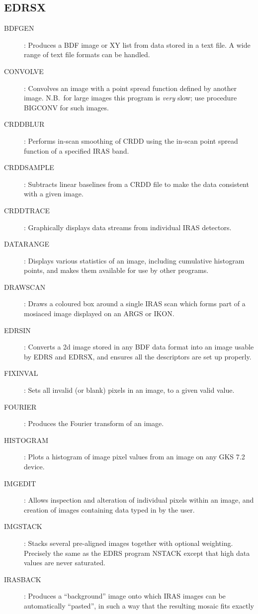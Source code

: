 \subsection {EDRSX}
\begin{description}
\begin{description}
\item[BDFGEN]: Produces a BDF image or XY list from data stored in a text file.
A wide range of text file formats can be handled.
\item[CONVOLVE]: Convolves an image with a point spread function defined by
another image.
N.B.\ for large images this program is {\em very} slow; use procedure BIGCONV
for such images.
\item[CRDDBLUR]: Performs in-scan smoothing of CRDD using the in-scan
point spread function of a specified IRAS band.
\item[CRDDSAMPLE]: Subtracts linear baselines from a CRDD file to make the 
data consistent with a given image.
\item[CRDDTRACE]: Graphically displays data streams from individual IRAS
detectors.
\item[DATARANGE]: Displays various statistics of an image, including cumulative
histogram points, and makes them available for use by other programs.
\item[DRAWSCAN]: Draws a coloured box around a single IRAS scan which forms
part of a mosiaced image displayed on an ARGS or IKON.
\item[EDRSIN]: Converts a 2d image stored in any BDF data format into an image
usable by EDRS and EDRSX, and ensures all the descriptors are set up properly. 
\item[FIXINVAL]: Sets all invalid (or blank) pixels in an image, to a given
valid value.
\item[FOURIER]: Produces the Fourier transform of an image.
\item[HISTOGRAM]: Plots a histogram of image pixel values from an image on any
GKS 7.2 device.
\item[IMGEDIT]: Allows inspection and alteration of individual pixels within
an image, and creation of images containing data typed in by the user.
\item[IMGSTACK]: Stacks several pre-aligned images together with optional
weighting.
Precisely the same as the EDRS program NSTACK except that high data values are
never saturated.
\item[IRASBACK]: Produces a ``background'' image onto which IRAS images can be
automatically ``pasted'', in such a way that the resulting mosaic fits exactly

\end{description}
\end{description}
